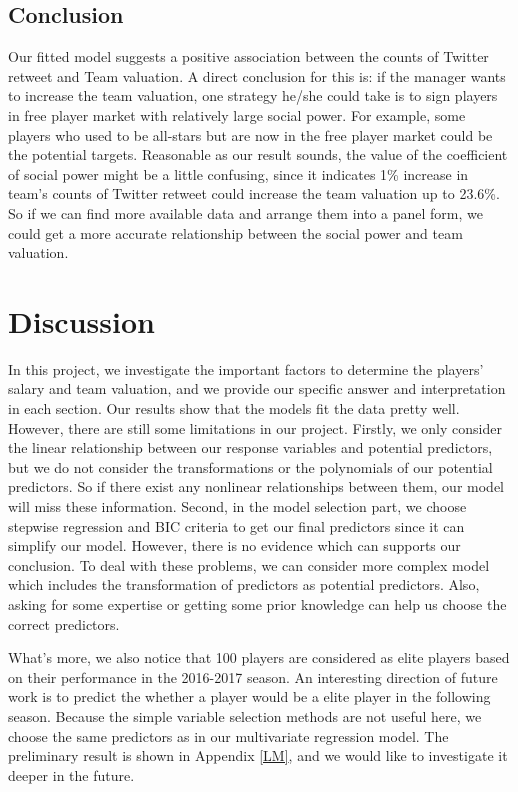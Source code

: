 \documentclass[12pt,]{article}
\begin{document}
\subsection{Conclusion}

Our fitted model suggests a positive association between the counts of
Twitter retweet and Team valuation. A direct conclusion for this is: if
the manager wants to increase the team valuation, one strategy he/she
could take is to sign players in free player market with relatively
large social power. For example, some players who used to be all-stars
but are now in the free player market could be the potential targets.
Reasonable as our result sounds, the value of the coefficient of social
power might be a little confusing, since it indicates 1\% increase in
team's counts of Twitter retweet could increase the team valuation up to
23.6\%. So if we can find more available data and arrange them into a
panel form, we could get a more accurate relationship between the social
power and team valuation.

\section{Discussion}

In this project, we investigate the important factors to determine the
players' salary and team valuation, and we provide our specific answer
and interpretation in each section. Our results show that the models fit
the data pretty well. However, there are still some limitations in our
project. Firstly, we only consider the linear relationship between our
response variables and potential predictors, but we do not consider the
transformations or the polynomials of our potential predictors. So if
there exist any nonlinear relationships between them, our model will
miss these information. Second, in the model selection part, we choose
stepwise regression and BIC criteria to get our final predictors since
it can simplify our model. However, there is no evidence which can
supports our conclusion. To deal with these problems, we can consider
more complex model which includes the transformation of predictors as
potential predictors. Also, asking for some expertise or getting some
prior knowledge can help us choose the correct predictors.

What's more, we also notice that 100 players are considered as elite
players based on their performance in the 2016-2017 season. An
interesting direction of future work is to predict the whether a player
would be a elite player in the following season. Because the simple
variable selection methods are not useful here, we choose the same
predictors as in our multivariate regression model. The preliminary
result is shown in Appendix \ref{LM}, and we would like to investigate
it deeper in the future.
\end{document}
